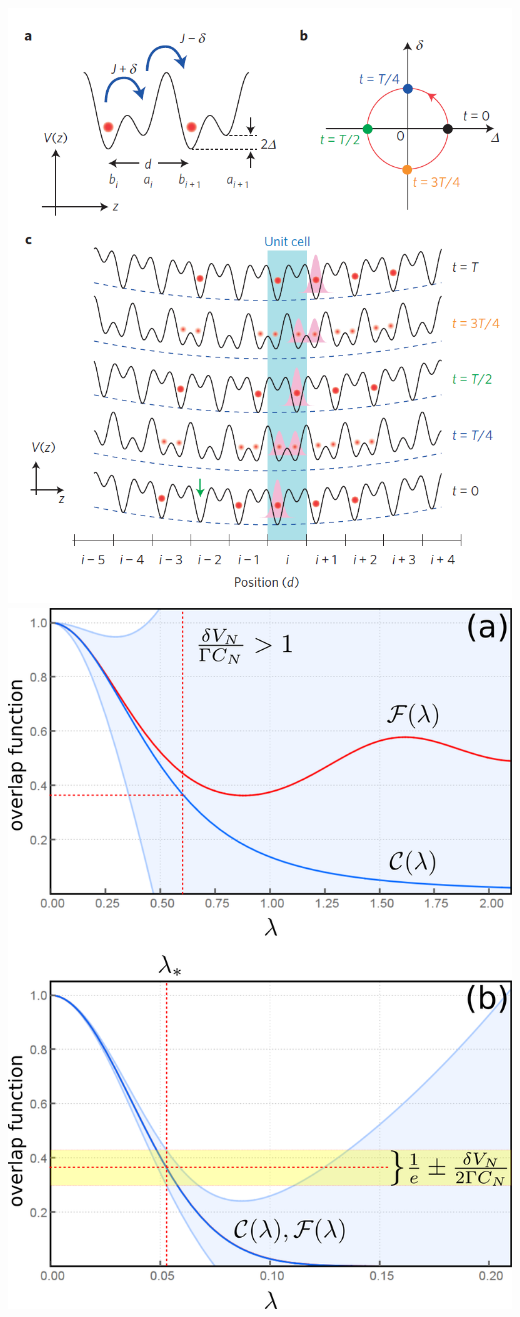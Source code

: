 \documentclass[portratit,a0paper,fontscale=0.48]{baposter} %
\begin{document}
\begin{poster}
{\begin{center}
\begin{multicols}{2}
\includegraphics[width=0.9\linewidth]{fig_from_Nakajima.png}
\includegraphics[width= 0.9 \linewidth]{Fig_2.png}
\end{multicols}


\end{center}}
\end{poster}
\end{document}
